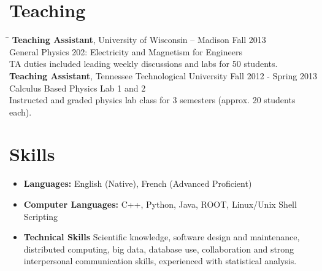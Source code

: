 \documentclass[10pt]{res} %
\begin{document}
\begin{resume}
\section{Teaching}
\vspace{-0.1in}

\begin{tabbing}
\hspace{3.5 in}\= \hspace{1.4in}\= \kill %
\textbf{Teaching Assistant}, University of Wisconsin -- Madison \>\> Fall 2013 \\
General Physics 202: Electricity and Magnetism for Engineers \\
TA duties included leading weekly discussions and labs for 50 students. \\
\textbf{Teaching Assistant}, Tennessee Technological University \>\> Fall 2012 - Spring 2013 \\
Calculus Based Physics Lab 1 and 2 \\
Instructed and graded physics lab class for 3 semesters (approx. 20 students each). \\
\end{tabbing}

\section{Skills}
\begin{itemize}
\item {\bf Languages:} English (Native),   French (Advanced Proficient)
\item {\bf Computer Languages: } C++,  Python, Java, ROOT, Linux/Unix Shell Scripting 
\item {\bf Technical Skills} Scientific knowledge, software design and maintenance, distributed computing, big data, database use, collaboration and strong interpersonal communication skills, experienced with statistical analysis. 
\end{itemize} 

\end{resume}
\end{document}
